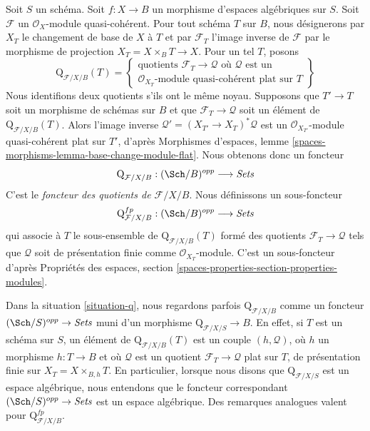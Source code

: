 \begin{situation}
\label{situation-q}
Soit $S$ un schéma. Soit $f : X \to B$ un morphisme d'espaces algébriques sur
$S$. Soit $\mathcal{F}$ un $\mathcal{O}_X$-module quasi-cohérent. Pour tout
schéma $T$ sur $B$, nous désignerons par $X_T$ le changement de base de $X$ à
$T$ et par $\mathcal{F}_T$ l'image inverse de $\mathcal{F}$ par le morphisme
de projection $X_T = X \times_B T \to X$. Pour un tel $T$, posons
$$
\text{Q}_{\mathcal{F}/X/B}(T) =
\left\{
\begin{matrix}
\text{quotients }\mathcal{F}_T \to \mathcal{Q}\text{ où }
\mathcal{Q}\text{ est un}\\
\mathcal{O}_{X_T}\text{-module quasi-cohérent plat sur }T
\end{matrix}
\right\}
$$
Nous identifions deux quotients s'ils ont le même noyau. Supposons que
$T' \to T$ soit un morphisme de schémas sur $B$ et que
$\mathcal{F}_T \to \mathcal{Q}$ soit un élément de
$\text{Q}_{\mathcal{F}/X/B}(T)$. Alors l'image inverse
$\mathcal{Q}' = (X_{T'} \to X_T)^*\mathcal{Q}$ est un
$\mathcal{O}_{X_{T'}}$-module quasi-cohérent plat sur $T'$, d'après Morphismes
d'espaces, lemme \ref{spaces-morphisms-lemma-base-change-module-flat}. Nous
obtenons donc un foncteur
\begin{equation}
\label{equation-q}
\text{Q}_{\mathcal{F}/X/B} : (\Sch/B)^{opp} \longrightarrow \textit{Sets}
\end{equation}
C'est le {\it foncteur des quotients de $\mathcal{F}/X/B$}. Nous définissons
un sous-foncteur
\begin{equation}
\label{equation-q-fp}
\text{Q}^{fp}_{\mathcal{F}/X/B} : (\Sch/B)^{opp} \longrightarrow \textit{Sets}
\end{equation}
qui associe à $T$ le sous-ensemble de $\text{Q}_{\mathcal{F}/X/B}(T)$ formé
des quotients $\mathcal{F}_T \to \mathcal{Q}$ tels que $\mathcal{Q}$ soit de
présentation finie comme $\mathcal{O}_{X_T}$-module. C'est un sous-foncteur
d'après Propriétés des espaces, section
\ref{spaces-properties-section-properties-modules}.
\end{situation}

\noindent
Dans la situation \ref{situation-q}, nous regardons parfois
$\text{Q}_{\mathcal{F}/X/B}$ comme un foncteur
$(\Sch/S)^{opp} \to \textit{Sets}$ muni d'un morphisme
$\text{Q}_{\mathcal{F}/X/S} \to B$. En effet, si $T$ est un schéma sur $S$,
un élément de $\text{Q}_{\mathcal{F}/X/B}(T)$ est un couple
$(h, \mathcal{Q})$, où $h$ un morphisme $h : T \to B$ et où $\mathcal{Q}$
est un quotient $\mathcal{F}_T \to \mathcal{Q}$ plat sur $T$, de présentation
finie sur $X_T = X \times_{B, h} T$. En particulier, lorsque nous disons que
$\text{Q}_{\mathcal{F}/X/S}$ est un espace algébrique, nous entendons que le
foncteur correspondant $(\Sch/S)^{opp} \to \textit{Sets}$ est un espace
algébrique. Des remarques analogues valent pour
$\text{Q}^{fp}_{\mathcal{F}/X/B}$.


